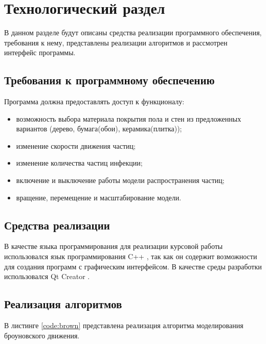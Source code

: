 \chapter{Технологический раздел}
\label{cha:impl}

В данном разделе будут описаны средства реализации программного обеспечения, требования к нему, представлены реализации алгоритмов и рассмотрен интерфейс программы.

\section{Требования к программному обеспечению}

Программа должна предоставлять доступ к функционалу:

\begin{itemize}
	\item возможность выбора материала покрытия пола и стен из предложенных вариантов (дерево, бумага(обои), керамика(плитка));
	\item изменение скорости движения частиц;
	\item изменение количества частиц инфекции;
	\item включение и выключение работы модели распространения частиц;
	\item вращение, перемещение и масштабирование модели.
\end{itemize}

\section{Средства реализации}

В качестве языка программирования для реализации курсовой работы использовался язык программирования C++ \cite{cplusplus}, так как он содержит возможности для создания программ с графическим интерфейсом. В качестве среды разработки использовался Qt Creator \cite{qtcreator}.

\section{Реализация алгоритмов}

В листинге \ref{code:brown} представлена реализация алгоритма моделирования броуновского движения.

